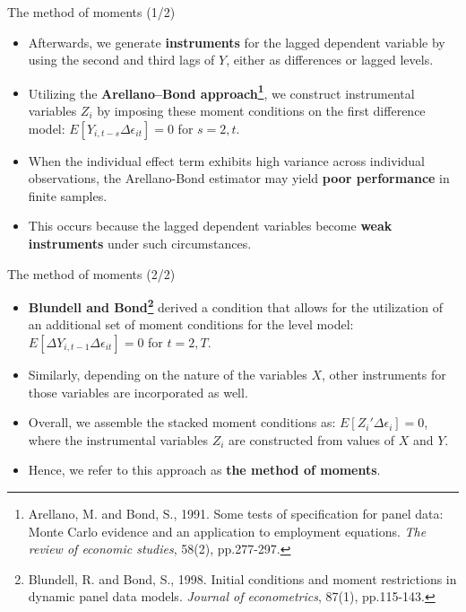 \documentclass[color=usenames,dvipsnames]{beamer}
\begin{document}
\begin{frame}{The method of moments (1/2)}

    \begin{itemize}
    
        \item Afterwards, we generate \textbf{instruments} for the lagged dependent variable by using the second and third lags of $Y$, either as differences or lagged levels.
        
        \item Utilizing the \textbf{Arellano–Bond approach\footnote{Arellano, M. and Bond, S., 1991. Some tests of specification for panel data: Monte Carlo evidence and an application to employment equations. \textit{The review of economic studies}, 58(2), pp.277-297.}}, we construct instrumental variables $Z_i$ by imposing these moment conditions on the first difference model: $E[Y_{i,t-s} \Delta \epsilon_{it}] = 0$ for $s = 2, t$.
        
        \item When the individual effect term exhibits high variance across individual observations, the Arellano-Bond estimator may yield \textbf{poor performance} in finite samples.
    
        \item This occurs because the lagged dependent variables become \textbf{weak instruments} under such circumstances.
    
    \end{itemize}
\end{frame}

\begin{frame}{The method of moments (2/2)}

    \begin{itemize}
        \item \textbf{Blundell and Bond\footnote{Blundell, R. and Bond, S., 1998. Initial conditions and moment restrictions in dynamic panel data models. \textit{Journal of econometrics}, 87(1), pp.115-143.}} derived a condition that allows for the utilization of an additional set of moment conditions for the level model: $E[\Delta Y_{i,t-1} \Delta \epsilon_{it}] = 0$ for $t = 2, T$.
        
        \item Similarly, depending on the nature of the variables $X$, other instruments for those variables are incorporated as well.
        
        \item Overall, we assemble the stacked moment conditions as: $E[Z_i'\Delta \epsilon_i] = 0$, where the instrumental variables $Z_i$ are constructed from values of $X$ and $Y$.

        \item Hence, we refer to this approach as \textbf{the method of moments}.
        
    \end{itemize}
    
\end{frame}
\end{document}
